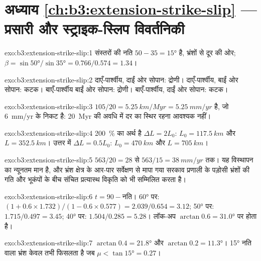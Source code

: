 \section*{अध्याय \ref{ch:b3:extension-strike-slip} --- प्रसारी और स्ट्राइक-स्लिप विवर्तनिकी}

\begin{solution}{exo:b3:extension-strike-slip:1}
संस्तरों की नति $50 - 35 = \ang{15}$ है, भ्रंशों से दूर की ओर; $\beta =
\sin\ang{50}/\sin\ang{35} = 0.766/0.574 = 1.34$।
\end{solution}

\begin{solution}{exo:b3:extension-strike-slip:2}
दाएँ-पार्श्वीय, दाईं ओर सोपान: द्रोणी। दाएँ-पार्श्वीय, बाईं ओर सोपान: कटक। बाएँ-पार्श्वीय
बाईं ओर सोपान: द्रोणी। बाएँ-पार्श्वीय, दाईं ओर सोपान: कटक।
\end{solution}

\begin{solution}{exo:b3:extension-strike-slip:3}
$105/20 = \qty{5.25}{km/Myr} = \qty{5.25}{mm/yr}$ है, जो
\qty{6}{mm/yr} के निकट है: \qty{20}{Myr} की अवधि में दर का स्थिर रहना आवश्यक नहीं।
\end{solution}

\begin{solution}{exo:b3:extension-strike-slip:4}
\qty{200}{\percent} का अर्थ है $\Delta L = 2L_0$: $L_0 = \qty{117.5}{km}$ और $L
= \qty{352.5}{km}$। उत्तर में $\Delta L = 0.5L_0$: $L_0 = \qty{470}{km}$
और $L = \qty{705}{km}$।
\end{solution}

\begin{solution}{exo:b3:extension-strike-slip:5}
$563/20 = 28$ से $563/15 = \qty{38}{mm/yr}$ तक। यह विस्थापन का न्यूनतम मान है, और
भ्रंश क्षेत्र के आर-पार सर्वेक्षण से मापा गया सरकाव
प्रणाली के पड़ोसी भ्रंशों की गति और भूकंपों के बीच संचित प्रत्यास्थ
विकृति को भी सम्मिलित करता है।
\end{solution}

\begin{solution}{exo:b3:extension-strike-slip:6}
$t = 90 - \text{नति}$। \ang{60} पर: $(1 + 0.6\times1.732)/(1 - 0.6\times
0.577) = 2.039/0.654 = 3.12$; \ang{50} पर: $1.715/0.497 = 3.45$;
\ang{40} पर: $1.504/0.285 = 5.28$। लॉक-अप $\arctan0.6 = \ang{31.0}$ पर होता है।
\end{solution}

\begin{solution}{exo:b3:extension-strike-slip:7}
$\arctan0.4 = \ang{21.8}$ और $\arctan0.2 = \ang{11.3}$। \ang{15} नति वाला भ्रंश
केवल तभी फिसलता है जब $\mu < \tan\ang{15} = 0.27$।
\end{solution}

